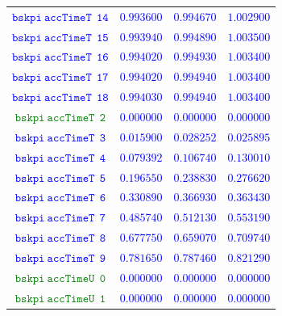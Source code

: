 \documentclass[10pt,a4paper]{article}
\begin{document}
\begin{table}[h!]
{\begin{tabular}{cccc}
\textcolor{blue}{$\mathtt{bskpi~accTimeT~~14}$} & \textcolor{blue}{$0.993600$}& \textcolor{blue}{$0.994670$}& \textcolor{blue}{$1.002900$}\\
\textcolor{blue}{$\mathtt{bskpi~accTimeT~~15}$} & \textcolor{blue}{$0.993940$}& \textcolor{blue}{$0.994890$}& \textcolor{blue}{$1.003500$}\\
\textcolor{blue}{$\mathtt{bskpi~accTimeT~~16}$} & \textcolor{blue}{$0.994020$}& \textcolor{blue}{$0.994930$}& \textcolor{blue}{$1.003400$}\\
\textcolor{blue}{$\mathtt{bskpi~accTimeT~~17}$} & \textcolor{blue}{$0.994020$}& \textcolor{blue}{$0.994940$}& \textcolor{blue}{$1.003400$}\\
\textcolor{blue}{$\mathtt{bskpi~accTimeT~~18}$} & \textcolor{blue}{$0.994030$}& \textcolor{blue}{$0.994940$}& \textcolor{blue}{$1.003400$}\\
\textcolor{Green}{$\mathtt{bskpi~accTimeT~~2}$} & \textcolor{blue}{$0.000000$}& \textcolor{blue}{$0.000000$}& \textcolor{blue}{$0.000000$}\\
\textcolor{blue}{$\mathtt{bskpi~accTimeT~~3}$} & \textcolor{blue}{$0.015900$}& \textcolor{blue}{$0.028252$}& \textcolor{blue}{$0.025895$}\\
\textcolor{blue}{$\mathtt{bskpi~accTimeT~~4}$} & \textcolor{blue}{$0.079392$}& \textcolor{blue}{$0.106740$}& \textcolor{blue}{$0.130010$}\\
\textcolor{blue}{$\mathtt{bskpi~accTimeT~~5}$} & \textcolor{blue}{$0.196550$}& \textcolor{blue}{$0.238830$}& \textcolor{blue}{$0.276620$}\\
\textcolor{blue}{$\mathtt{bskpi~accTimeT~~6}$} & \textcolor{blue}{$0.330890$}& \textcolor{blue}{$0.366930$}& \textcolor{blue}{$0.363430$}\\
\textcolor{blue}{$\mathtt{bskpi~accTimeT~~7}$} & \textcolor{blue}{$0.485740$}& \textcolor{blue}{$0.512130$}& \textcolor{blue}{$0.553190$}\\
\textcolor{blue}{$\mathtt{bskpi~accTimeT~~8}$} & \textcolor{blue}{$0.677750$}& \textcolor{blue}{$0.659070$}& \textcolor{blue}{$0.709740$}\\
\textcolor{blue}{$\mathtt{bskpi~accTimeT~~9}$} & \textcolor{blue}{$0.781650$}& \textcolor{blue}{$0.787460$}& \textcolor{blue}{$0.821290$}\\
\textcolor{Green}{$\mathtt{bskpi~accTimeU~~0}$} & \textcolor{blue}{$0.000000$}& \textcolor{blue}{$0.000000$}& \textcolor{blue}{$0.000000$}\\
\textcolor{Green}{$\mathtt{bskpi~accTimeU~~1}$} & \textcolor{blue}{$0.000000$}& \textcolor{blue}{$0.000000$}& \textcolor{blue}{$0.000000$}\\

\end{tabular}}
\end{table}
\end{document}
